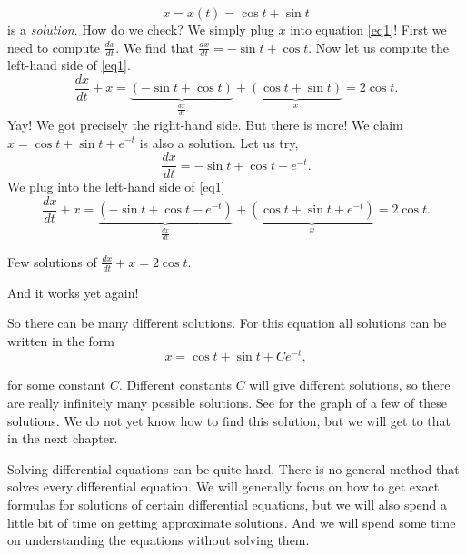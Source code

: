 \documentclass{ximera}
\begin{document}
\begin{equation*}
    x = x(t) = \cos t + \sin t
\end{equation*}
is a \emph{solution}. How do we check?  We simply plug $x$ into equation \eqref{eq1}!  First we need to compute $\frac{dx}{dt}$.  We find that $\frac{dx}{dt} = -\sin t + \cos t$.  Now let us compute the left-hand side of \eqref{eq1}.
\begin{equation*}
    \frac{dx}{dt} + x = \underbrace{(-\sin t + \cos t)}_{\frac{dx}{dt}} + \underbrace{(\cos t + \sin t)}_{x} = 2\cos t .
\end{equation*}
Yay! We got precisely the right-hand side. But there is more! We claim $x = \cos t + \sin t + e^{-t}$ is also a solution.  Let us try,
\begin{equation*}
    \frac{dx}{dt} = -\sin t + \cos t - e^{-t} .
\end{equation*}
We plug into the left-hand side of \eqref{eq1}
\begin{equation*}
    \frac{dx}{dt} + x = \underbrace{(-\sin t + \cos t - e^{-t})}_{\frac{dx}{dt}} + \underbrace{(\cos t + \sin t + e^{-t})}_{x} = 2\cos t .
\end{equation*}

\begin{mywrapfig}{2.75in}
    \capstart
    \caption{Few solutions of $\frac{dx}{dt} + x = 2 \cos t$.\label{intro:plotsfig}}
\end{mywrapfig}%

And it works yet again!

So there can be many different solutions.  For this equation all solutions can be written in the form
\begin{equation*}
    x = \cos t + \sin t + C e^{-t} ,
\end{equation*}

for some constant $C$.  Different constants $C$ will give different solutions, so there are really infinitely many possible solutions. See  for the graph of a few of these solutions.  We do not yet know how to find this solution, but we will get to that in the next chapter.

Solving differential equations can be quite hard. There is no general method that solves every differential equation.  We will generally focus on how to get exact formulas for solutions of certain differential equations, but we will also spend a little bit of time on getting approximate solutions. And we will spend some time on understanding the equations without solving them.
\end{document}
